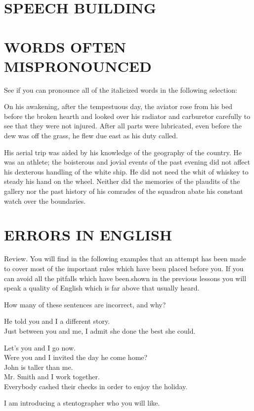 \documentclass[10pt]{article}
\begin{document}
\section*{SPEECH BUILDING}
\section*{WORDS OFTEN MISPRONOUNCED}
See if you can pronounce all of the italicized words in the following selection:

On his awakening, after the tempestuous day, the aviator rose from his bed before the broken hearth and looked over his radiator and carburetor carefully to see that they were not injured. After all parts were lubricated, even before the dew was off the grass, he flew due east as his duty called.

His aerial trip was aided by his knowledge of the geography of the country. He was an athlete; the boisterous and jovial events of the past evening did not affect his dexterous handling of the white ship. He did not need the whit of whiskey to steady his hand on the wheel. Neither did the memories of the plaudits of the gallery nor the past history of his comrades of the squadron abate his constant watch over the boundaries.

\section*{ERRORS IN ENGLISH}
Review. You will find in the following examples that an attempt has been made to cover most of the important rules which have been placed before you. If you can avoid all the pitfalls which have been.shown in the previous lessons you will speak a quality of English which is far above that usually heard.

How many of these sentences are incorrect, and why?

He told you and I a different story.\\
Just between you and me, I admit she done the best she could.

Let's you and I go now.\\
Were you and I invited the day he come home?\\
John is taller than me.\\
Mr. Smith and I work together.\\
Everybody cashed their checks in order to enjoy the holiday.

I am introducing a stentographer who you will like.
\end{document}
